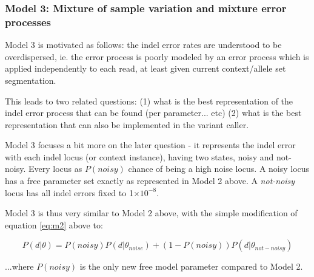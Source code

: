 \documentclass{article}
\newcommand{\e}[1]{\ensuremath{\times 10^{#1}}}
\begin{document}
\subsubsection{Model 3: Mixture of sample variation and mixture error processes}

Model 3 is motivated as follows: the indel error rates are understood to be overdispersed, ie. the error process is poorly modeled by an error process which is applied independently to each read, at least given current context/allele set segmentation.

This leads to two related questions: (1) what is the best representation of the indel error process that can be found (per parameter... etc) (2) what is the best representation that can also be implemented in the variant caller.

Model 3 focuses a bit more on the later question - it represents the indel error with each indel locus (or context instance), having two states, noisy and not-noisy. Every locus as $P(noisy)$ chance of being a high noise locus. A noisy locus has a free parameter set exactly as represented in Model 2 above. A \emph{not-noisy} locus has all indel errors fixed to 1\e{-8}.

Model 3 is thus very similar to Model 2 above, with the simple modification of equation \ref{eq:m2} above to:

\begin{equation}
P(d \vert \theta) = P(noisy) P (d \vert \theta_{noise}) + (1-P(noisy)) P (d \vert \theta_{not-noisy})
\end{equation}

...where $P(noisy)$ is the only new free model parameter compared to Model 2.








\end{document}
